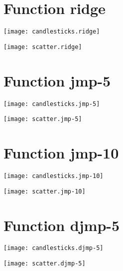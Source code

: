 \section{Function ridge}
\begin{center}

\end{center}
\begin{center}

\end{center}
\begin{center}
\texttt{[image: candlesticks.ridge]}
\end{center}
\begin{center}
\texttt{[image: scatter.ridge]}
\end{center}
\newpage
\section{Function jmp-5}
\begin{center}

\end{center}
\begin{center}

\end{center}
\begin{center}
\texttt{[image: candlesticks.jmp-5]}
\end{center}
\begin{center}
\texttt{[image: scatter.jmp-5]}
\end{center}
\newpage
\section{Function jmp-10}
\begin{center}

\end{center}
\begin{center}

\end{center}
\begin{center}
\texttt{[image: candlesticks.jmp-10]}
\end{center}
\begin{center}
\texttt{[image: scatter.jmp-10]}
\end{center}
\newpage
\section{Function djmp-5}
\begin{center}

\end{center}
\begin{center}

\end{center}
\begin{center}
\texttt{[image: candlesticks.djmp-5]}
\end{center}
\begin{center}
\texttt{[image: scatter.djmp-5]}
\end{center}
\newpage
